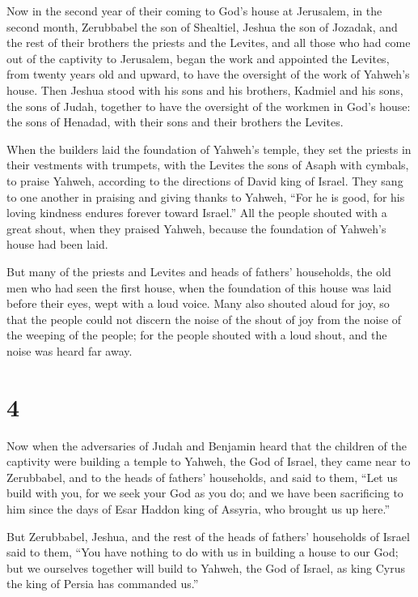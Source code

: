  Now in the second year of their coming to God's house at
Jerusalem, in the second month, Zerubbabel the son of Shealtiel, Jeshua
the son of Jozadak, and the rest of their brothers the priests and the
Levites, and all those who had come out of the captivity to Jerusalem,
began the work and appointed the Levites, from twenty years old and
upward, to have the oversight of the work of Yahweh's house.
 Then Jeshua stood with his sons and his brothers, Kadmiel
and his sons, the sons of Judah, together to have the oversight of the
workmen in God's house: the sons of Henadad, with their sons and their
brothers the Levites.

 When the builders laid the foundation of Yahweh's
temple, they set the priests in their vestments with trumpets, with the
Levites the sons of Asaph with cymbals, to praise Yahweh, according to
the directions of David king of Israel.  They sang to one
another in praising and giving thanks to Yahweh, ``For he is good, for
his loving kindness endures forever toward Israel.'' All the people
shouted with a great shout, when they praised Yahweh, because the
foundation of Yahweh's house had been laid.

 But many of the priests and Levites and heads of
fathers' households, the old men who had seen the first house, when the
foundation of this house was laid before their eyes, wept with a loud
voice. Many also shouted aloud for joy,  so that the
people could not discern the noise of the shout of joy from the noise of
the weeping of the people; for the people shouted with a loud shout, and
the noise was heard far away.

\hypertarget{section-3}{%
\section{4}\label{section-3}}

 Now when the adversaries of Judah and Benjamin heard that
the children of the captivity were building a temple to Yahweh, the God
of Israel,  they came near to Zerubbabel, and to the heads
of fathers' households, and said to them, ``Let us build with you, for
we seek your God as you do; and we have been sacrificing to him since
the days of Esar Haddon king of Assyria, who brought us up here.''

 But Zerubbabel, Jeshua, and the rest of the heads of
fathers' households of Israel said to them, ``You have nothing to do
with us in building a house to our God; but we ourselves together will
build to Yahweh, the God of Israel, as king Cyrus the king of Persia has
commanded us.''

